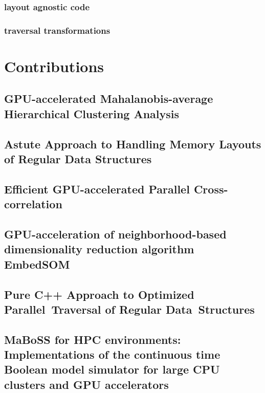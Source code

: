 \documentclass[12pt,a4paper]{report}
\begin{document}
\section{layout agnostic code}

\section{traversal transformations}

\part{Contributions}

% 
% 
% 
% 

\chapter{GPU-accelerated Mahalanobis-average Hierarchical Clustering Analysis}
\chapter{Astute Approach to Handling Memory Layouts of Regular Data Structures}
\chapter{Efficient GPU-accelerated Parallel Cross-correlation}
\chapter{GPU-acceleration of neighborhood-based dimensionality reduction algorithm EmbedSOM}


\chapter{Pure C++ Approach to Optimized Parallel~Traversal of Regular Data~Structures}

\chapter{MaBoSS for HPC environments: Implementations of the continuous time Boolean model simulator for large CPU clusters and GPU accelerators}




\end{document}
